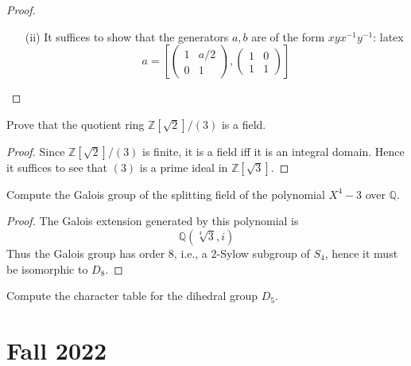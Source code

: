 \documentclass[openany]{book}
\newcommand{\Z}{\mathbb{Z}}
\newcommand{\Q}{\mathbb{Q}}
\begin{document}
\begin{proof}
\begin{enumerate}
        \item[(ii)] It suffices to show that the generators $a,b$ are of the form $xyx^{-1}y^{-1}$:
        latex
        \begin{equation*}
            a=\left[\begin{pmatrix}
                1 & a/2 \\
                0 & 1
                \end{pmatrix}, \begin{pmatrix}
                    1 & 0 \\
                    1 & 1
                    \end{pmatrix}\right]
        \end{equation*}
    \end{enumerate}
\end{proof}


\begin{prob}
    Prove that the quotient ring \( \mathbb{Z}[\sqrt{2}]/(3) \) is a field.
\end{prob}
\begin{proof}
    Since $\Z[\sqrt{2}]/(3)$ is finite, it is a field iff it is an integral domain. Hence it suffices to see that $(3)$ is a prime ideal in $\Z[\sqrt{3}]$.
\end{proof}



\begin{prob}
    Compute the Galois group of the splitting field of the polynomial \( X^4 - 3 \) over \( \mathbb{Q} \).
\end{prob}
\begin{proof}
    The Galois extension generated by this polynomial is 
    \begin{equation*}
        \Q(\sqrt[4]{3}, i)
    \end{equation*}
    Thus the Galois group has order $8$, i.e., a $2$-Sylow subgroup of $S_4$, hence it must be isomorphic to $D_8$.
\end{proof}




\begin{prob}
    Compute the character table for the dihedral group \( D_5 \).
\end{prob}




\chapter{Fall 2022}
\end{document}
